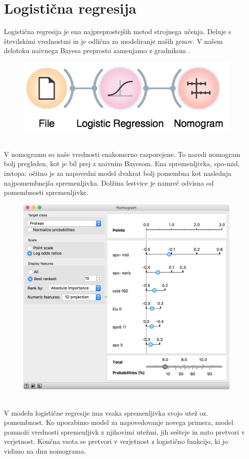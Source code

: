 \chapter{Logistična regresija}
\label{ch:logisticna-regresija}

Logistična regresija je ena najpreprostejših metod strojnega učenja. Deluje s številskimi vrednostmi in je odlična za modeliranje naših genov. V našem delotoku naivnega Bayesa preprosto zamenjamo z gradnikom .

\begin{figure}[h]
    \includegraphics[width=0.6\linewidth]{workflow.png}
    \caption{$\;$}
\end{figure}

V nomogramu so naše vrednosti enakomerno razporejene. To naredi nomogram bolj pregleden, kot je bil prej z naivnim Bayesom. Ena spremenljivka, spo-mid, izstopa: očitno je za napovedni model dvakrat bolj pomembna kot naslednja najpomembnejša spremenljivka. Dolžina lestvice je namreč odvisna od pomembnosti spremenljivke.

\begin{figure}
    \includegraphics[scale=0.45]{nomogram.png}
    \caption{$\;$}
\end{figure}

V modelu logistične regresije ima vsaka spremenljivka svojo utež oz. pomembnost. Ko uporabimo model za napovedovanje novega primera, model pomnoži vrednosti spremenljivk z njihovimi utežmi, jih sešteje in nato pretvori v verjetnost. Končna vsota se pretvori v verjetnost z logistično funkcijo, ki jo vidimo na dnu nomograma.

